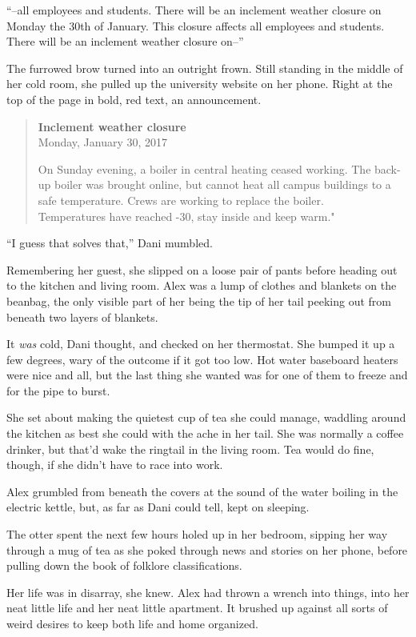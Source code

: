 ``--all employees and students. There will be an inclement weather closure on Monday the 30th of January. This closure affects all employees and students. There will be an inclement weather closure on--''

The furrowed brow turned into an outright frown. Still standing in the middle of her cold room, she pulled up the university website on her phone. Right at the top of the page in bold, red text, an announcement.

\begin{quote}
\textbf{Inclement weather closure}\\
Monday, January 30, 2017

On Sunday evening, a boiler in central heating ceased working. The back-up boiler was brought online, but cannot heat all campus buildings to a safe temperature. Crews are working to replace the boiler.\\
Temperatures have reached -30, stay inside and keep warm."
\end{quote}

``I guess that solves that,'' Dani mumbled.

Remembering her guest, she slipped on a loose pair of pants before heading out to the kitchen and living room. Alex was a lump of clothes and blankets on the beanbag, the only visible part of her being the tip of her tail peeking out from beneath two layers of blankets.

It \emph{was} cold, Dani thought, and checked on her thermostat. She bumped it up a few degrees, wary of the outcome if it got too low. Hot water baseboard heaters were nice and all, but the last thing she wanted was for one of them to freeze and for the pipe to burst.

She set about making the quietest cup of tea she could manage, waddling around the kitchen as best she could with the ache in her tail. She was normally a coffee drinker, but that'd wake the ringtail in the living room. Tea would do fine, though, if she didn't have to race into work.

Alex grumbled from beneath the covers at the sound of the water boiling in the electric kettle, but, as far as Dani could tell, kept on sleeping.

The otter spent the next few hours holed up in her bedroom, sipping her way through a mug of tea as she poked through news and stories on her phone, before pulling down the book of folklore classifications.

Her life was in disarray, she knew. Alex had thrown a wrench into things, into her neat little life and her neat little apartment. It brushed up against all sorts of weird desires to keep both life and home organized.

